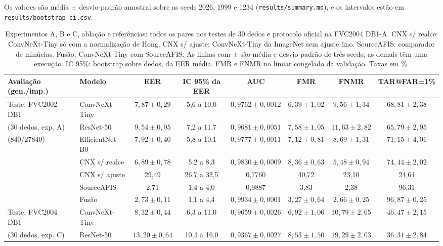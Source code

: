 \documentclass[conference]{IEEEtran}
\begin{document}
Os valores são média $\pm$ desvio-padrão amostral sobre as seeds 2026, 1999 e 1234 (\texttt{results/summary.md}), e os intervalos estão em \texttt{results/bootstrap\_ci.csv}.

\begin{table}[t]
\centering
\caption{Experimentos A, B e C, ablação e referências: todos os pares nos testes de 30 dedos e protocolo oficial na FVC2004 DB1-A. CNX s/ realce: ConvNeXt-Tiny só com a normalização de Hong. CNX s/ ajuste: ConvNeXt-Tiny da ImageNet sem ajuste fino. SourceAFIS: comparador de minúcias. Fusão: ConvNeXt-Tiny com SourceAFIS. As linhas com $\pm$ são média e desvio-padrão de três seeds; as demais têm uma execução. IC 95\%: bootstrap sobre dedos, da EER média. FMR e FNMR no limiar congelado da validação. Taxas em \%.}
\label{tab:expB}
\footnotesize
\setlength{\tabcolsep}{4pt}
\begin{tabular}{@{}llcccccc@{}}
\toprule
Avaliação (gen./imp.) & Modelo & EER & IC 95\% da EER & AUC & FMR & FNMR & TAR@FAR=1\% \\
\midrule
Teste, FVC2002 DB1 & ConvNeXt-Tiny & $7{,}87\pm0{,}29$ & 5,6 a 10,0 & $0{,}9762\pm0{,}0012$ & $6{,}39\pm1{,}02$ & $9{,}56\pm1{,}34$ & $68{,}81\pm2{,}38$ \\
(30 dedos, exp. A) & ResNet-50 & $9{,}54\pm0{,}95$ & 7,2 a 11,7 & $0{,}9681\pm0{,}0051$ & $7{,}58\pm1{,}05$ & $11{,}63\pm2{,}82$ & $65{,}79\pm2{,}95$ \\
(840/\num{27840}) & EfficientNet-B0 & $7{,}92\pm0{,}40$ & 5,8 a 10,1 & $0{,}9777\pm0{,}0011$ & $7{,}12\pm0{,}81$ & $8{,}69\pm1{,}31$ & $71{,}15\pm4{,}01$ \\
 & CNX s/ realce & $6{,}89\pm0{,}78$ & 5,2 a 8,3 & $0{,}9830\pm0{,}0009$ & $8{,}36\pm0{,}63$ & $5{,}48\pm0{,}94$ & $74{,}44\pm2{,}02$ \\
 & CNX s/ ajuste & 29,49 & 26,7 a 32,5 & 0,7760 & 40,72 & 23,10 & 24,64 \\
 & SourceAFIS & 2,71 & 1,4 a 4,0 & 0,9887 & 3,83 & 2,38 & 96,31 \\
 & Fusão & $2{,}73\pm0{,}11$ & 1,1 a 4,4 & $0{,}9934\pm0{,}0001$ & $3{,}27\pm0{,}64$ & $2{,}66\pm0{,}25$ & $96{,}87\pm0{,}25$ \\
\midrule
Teste, FVC2004 DB1 & ConvNeXt-Tiny & $8{,}32\pm0{,}44$ & 6,3 a 11,0 & $0{,}9659\pm0{,}0026$ & $6{,}92\pm1{,}06$ & $10{,}79\pm2{,}65$ & $46{,}47\pm2{,}15$ \\
(30 dedos, exp. C) & ResNet-50 & $13{,}20\pm0{,}64$ & 10,4 a 16,0 & $0{,}9367\pm0{,}0027$ & $8{,}53\pm1{,}50$ & $19{,}29\pm2{,}03$ & $36{,}31\pm2{,}84$ \\

\end{tabular}
\end{table}
\end{document}
